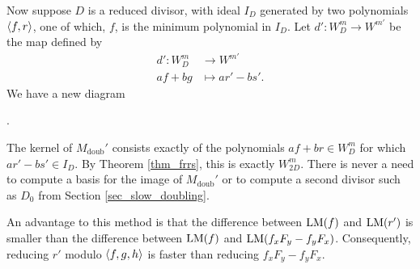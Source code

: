 Now suppose $D$ is a reduced divisor,
with ideal $I_D$ generated by two polynomials $\left\langle f,r \right\rangle$,
one of which, $f$, is the minimum polynomial in $I_D$.
Let $d' : W_D^m \to W^{m'}$ be the map defined by
\begin{align*}
  d' : W_D^m &\to W^{m'} \\
  af + bg &\mapsto ar' - bs'.
\end{align*}
We have a new diagram
\begin{center}
  .
\end{center}
The kernel of $M_{\text{doub}}'$ consists exactly of the polynomials $af + br \in W_D^m$ for which $ar' - bs' \in I_D$.
By Theorem \ref{thm_frrs}, this is exactly $W_{2D}^m$.
There is never a need to compute a basis for the image of $M_{\text{doub}}'$
or to compute a second divisor such as $D_0$ from Section \ref{sec_slow_doubling}.

An advantage to this method is that the difference between $\operatorname{LM}(f)$ and $\operatorname{LM}(r')$
is smaller than the difference between $\operatorname{LM}(f)$ and $\operatorname{LM}(f_xF_y - f_yF_x)$.
Consequently, reducing $r'$ modulo $\left\langle f,g,h \right\rangle$ is faster than reducing $f_xF_y - f_yF_x$.

